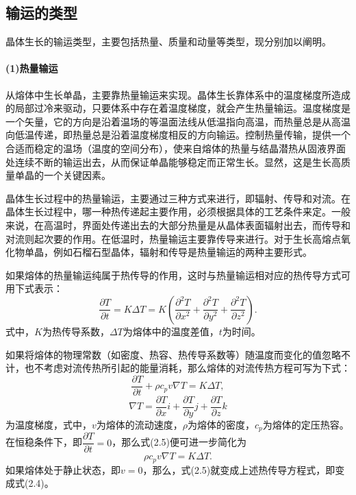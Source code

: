 \subsection{输运的类型}
晶体生长的输运类型，主要包括热量、质量和动量等类型，现分别加以阐明。

\paragraph{(1)热量输运}从熔体中生长单晶，主要靠热量输运来实现。晶体生长靠体系中的温度梯度所造成的局部过冷来驱动，只要体系中存在着温度梯度，就会产生热量输运。温度梯度是一个矢量，它的方向是沿着温场的等温面法线从低温指向高温，而热量总是从高温向低温传递，即热量总是沿着温度梯度相反的方向输运。控制热量传输，提供一个合适而稳定的温场（温度的空间分布），使来自熔体的热量与结晶潜热从固液界面处连续不断的输运出去，从而保证单晶能够稳定而正常生长。显然，这是生长高质量单晶的一个关键因素。

晶体生长过程中的热量输运，主要通过三种方式来进行，即辐射、传导和对流。在晶体生长过程中，哪一种热传递起主要作用，必须根据具体的工艺条件来定。一般来说，在高温时，界面处传递出去的大部分热量是从晶体表面辐射出去，而传导和对流则起次要的作用。在低温时，热量输运主要靠传导来进行。对于生长高熔点氧化物单晶，例如石榴石型晶体，辐射和传导是热量输运的两种主要形式。

如果熔体的热量输运纯属于热传导的作用，这时与热量输运相对应的热传导方式可用下式表示：
\begin{equation}
\frac{\partial T}{\partial t}=K\Delta T=K(\frac{\partial^2T}{\partial x^2}+\frac{\partial^2T}{\partial y^2}+\frac{\partial^2T}{\partial z^2}).
\end{equation}
式中，$K$为热传导系数，$\Delta T$为熔体中的温度差值，$t$为时间。

如果将熔体的物理常数（如密度、热容、热传导系数等）随温度而变化的值忽略不计，也不考虑对流传热所引起的能量消耗，那么熔体的对流传热方程可写为下式：
\begin{equation}
\frac{\partial T}{\partial t}+\rho c_pv\nabla T=K\Delta T,
\end{equation}
$$\nabla T=\frac{\partial T}{\partial x}i+\frac{\partial T}{\partial y}j+\frac{\partial T}{\partial z}k$$
为温度梯度，式中，$v$为熔体的流动速度，$\rho$为熔体的密度，$c_p$为熔体的定压热容。
在恒稳条件下，即$\dfrac{\partial T}{\partial t}=0$，那么式(2.5)便可进一步简化为
\begin{equation}
\rho c_pv\nabla T=K\Delta T.
\end{equation}
如果熔体处于静止状态，即$v=0$，那么，式(2.5)就变成上述热传导方程式，即变成式(2.4)。